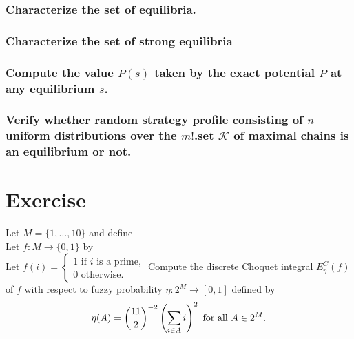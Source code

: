 \documentclass{article}
\begin{document}
\subsubsection{Characterize the set of equilibria.}

\subsubsection{Characterize the set of strong equilibria}

\subsubsection{Compute the value $P(s)$ taken by the exact potential $P$ at any equilibrium $s$.}

\subsubsection{Verify whether random strategy profile consisting of $n$ uniform distributions over the $m!$.set $\mathcal{K}$ of maximal chains is an equilibrium or not.}

\section{Exercise}
Let $M=\{1,\ldots,10\}$ and define \\
Let $f:M\rightarrow\{0,1\}$ by \\
Let $f(i)=\left\{\begin{array}{c}
                        1\text{ if }i\text{ is a prime,}\\
                        0\text{ otherwise.}
             \end{array}\right .$
Compute the discrete Choquet integral $E_{\eta}^C(f)$ of $f$ with respect to fuzzy probability $\eta:2^M\rightarrow[0,1]$ defined by
$$\eta(A)=\binom{11}{2}^{-2}\left(\sum_{i\in A}i\right)^2\text{ for all }A\in 2^M\text .$$


\medskip
 
\end{document}
